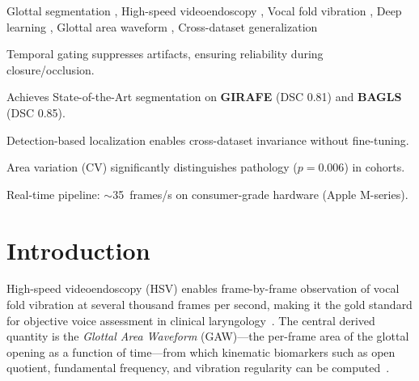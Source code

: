 \documentclass[preprint,12pt]{elsarticle}
\newcommand{\girafe}{\textbf{GIRAFE}}
\newcommand{\bagls}{\textbf{BAGLS}}
\newcommand{\gaw}{GAW}
\begin{document}
\begin{frontmatter}
\begin{keyword}
Glottal segmentation \sep{} High-speed videoendoscopy \sep{} Vocal fold vibration \sep
Deep learning \sep{} Glottal area waveform \sep{} Cross-dataset generalization
\end{keyword}

\begin{highlights}
\item Temporal gating suppresses artifacts, ensuring reliability during closure/occlusion.
\item Achieves State-of-the-Art segmentation on \girafe{} (DSC 0.81) and \bagls{} (DSC 0.85).
\item Detection-based localization enables cross-dataset invariance without fine-tuning.
\item Area variation (CV) significantly distinguishes pathology ($p{=}0.006$) in cohorts.
\item Real-time pipeline: ${\sim}$\SI{35}{frames/s} on consumer-grade hardware (Apple M-series).
\end{highlights}

\end{frontmatter}

\section{Introduction}
\label{sec:intro}

High-speed videoendoscopy (HSV) enables frame-by-frame observation of vocal
fold vibration at several thousand frames per second, making it the gold
standard for objective voice assessment in clinical laryngology~\cite{deliyski2008laryngoscope}.
The central derived quantity is the \emph{Glottal Area Waveform} (\gaw{})---the
per-frame area of the glottal opening as a function of time---from which
kinematic biomarkers such as open quotient, fundamental frequency, and
vibration regularity can be computed~\cite{little2007glottal,deliyski2008laryngoscope,lohscheller2008laryngoscope,patel2016nodules}.
\end{document}
